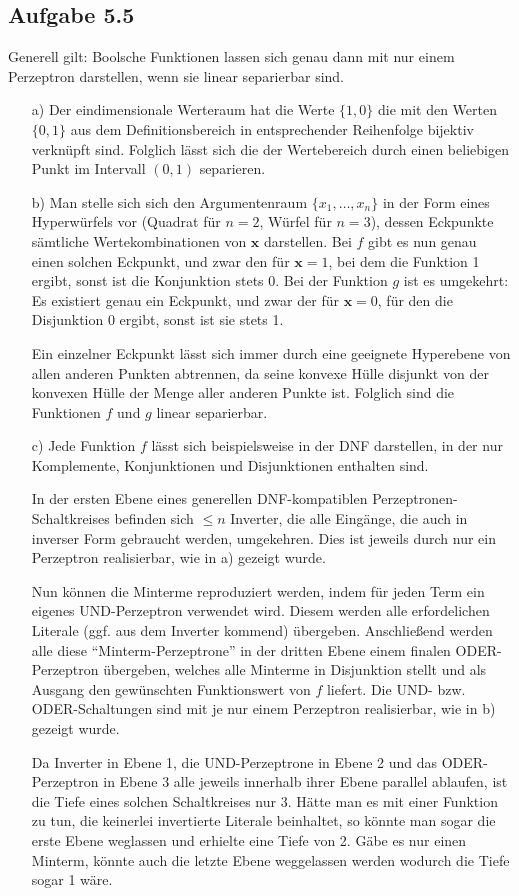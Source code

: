 \documentclass{article}
\begin{document}
    \subsection*{Aufgabe 5.5}
    Generell gilt: Boolsche Funktionen lassen sich genau dann mit nur einem Perzeptron darstellen, wenn sie linear separierbar sind. 
    \begin{enumerate}
        \item[a)] Der eindimensionale Werteraum hat die Werte $\{1, 0\}$ die mit den Werten $\{0, 1\}$ aus dem Definitionsbereich in entsprechender Reihenfolge bijektiv verknüpft sind. Folglich lässt sich die der Wertebereich durch einen beliebigen Punkt im Intervall $(0,1)$ separieren. 
        \item[b)] Man stelle sich sich den Argumentenraum $\{x_1, \ldots, x_n\}$ in der Form eines Hyperwürfels vor (Quadrat für $n=2$, Würfel für $n=3$), dessen Eckpunkte sämtliche Wertekombinationen von $\mathbf{x}$ darstellen. Bei $f$ gibt es nun genau einen solchen Eckpunkt, und zwar den für $\mathbf{x} = 1$, bei dem die Funktion 1 ergibt, sonst ist die Konjunktion stets 0. Bei der Funktion $g$ ist es umgekehrt: Es existiert genau ein Eckpunkt, und zwar der für $\mathbf{x} = 0$, für den die Disjunktion 0 ergibt, sonst ist sie stets 1. 
        
        Ein einzelner Eckpunkt lässt sich immer durch eine geeignete Hyperebene von allen anderen Punkten abtrennen, da seine konvexe Hülle disjunkt von der konvexen Hülle der Menge aller anderen Punkte ist. Folglich sind die Funktionen $f$ und $g$ linear separierbar. 
        \item[c)] Jede Funktion $f$ lässt sich beispielsweise in der DNF darstellen, in der nur Komplemente, Konjunktionen und Disjunktionen enthalten sind. 
        
        In der ersten Ebene eines generellen DNF-kompatiblen Perzeptronen-Schaltkreises befinden sich $\le n$ Inverter, die alle Eingänge, die auch in inverser Form gebraucht werden, umgekehren. Dies ist jeweils durch nur ein Perzeptron realisierbar, wie in a) gezeigt wurde.

        Nun können die Minterme reproduziert werden, indem für jeden Term ein eigenes UND-Perzeptron verwendet wird. Diesem werden alle erfordelichen Literale (ggf. aus dem Inverter kommend) übergeben. Anschließend werden alle diese "`Minterm-Perzeptrone"' in der dritten Ebene einem finalen ODER-Perzeptron übergeben, welches alle Minterme in Disjunktion stellt und als Ausgang den gewünschten Funktionswert von $f$ liefert. Die UND- bzw. ODER-Schaltungen sind mit je nur einem Perzeptron realisierbar, wie in b) gezeigt wurde.

        Da Inverter in Ebene 1, die UND-Perzeptrone in Ebene 2 und das ODER-Perzeptron in Ebene 3 alle jeweils innerhalb ihrer Ebene parallel ablaufen, ist die Tiefe eines solchen Schaltkreises nur 3. Hätte man es mit einer Funktion zu tun, die keinerlei invertierte Literale beinhaltet, so könnte man sogar die erste Ebene weglassen und erhielte eine Tiefe von 2. Gäbe es nur einen Minterm, könnte auch die letzte Ebene weggelassen werden wodurch die Tiefe sogar 1 wäre. 
    \end{enumerate}
\end{document}
